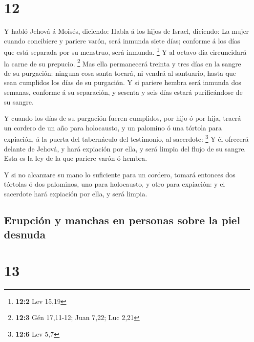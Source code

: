 \hypertarget{section-11}{%
\section{12}\label{section-11}}

 Y habló Jehová á Moisés, diciendo:  Habla á los
hijos de Israel, diciendo: La mujer cuando concibiere y pariere varón,
será inmunda siete días; conforme á los días que está separada por su
menstruo, será inmunda. \footnote{\textbf{12:2} Lev 15,19} 
Y al octavo día circuncidará la carne de su prepucio. \footnote{\textbf{12:3}
  Gén 17,11-12; Juan 7,22; Luc 2,21}  Mas ella permanecerá
treinta y tres días en la sangre de su purgación: ninguna cosa santa
tocará, ni vendrá al santuario, hasta que sean cumplidos los días de su
purgación.  Y si pariere hembra será inmunda dos semanas,
conforme á su separación, y sesenta y seis días estará purificándose de
su sangre.

 Y cuando los días de su purgación fueren cumplidos, por
hijo ó por hija, traerá un cordero de un año para holocausto, y un
palomino ó una tórtola para expiación, á la puerta del tabernáculo del
testimonio, al sacerdote: \footnote{\textbf{12:6} Lev 5,7} 
Y él ofrecerá delante de Jehová, y hará expiación por ella, y será
limpia del flujo de su sangre. Esta es la ley de la que pariere varón ó
hembra.

 Y si no alcanzare su mano lo suficiente para un cordero,
tomará entonces dos tórtolas ó dos palominos, uno para holocausto, y
otro para expiación: y el sacerdote hará expiación por ella, y será
limpia.

\hypertarget{erupciuxf3n-y-manchas-en-personas-sobre-la-piel-desnuda}{%
\subsection{Erupción y manchas en personas sobre la piel
desnuda}\label{erupciuxf3n-y-manchas-en-personas-sobre-la-piel-desnuda}}

\hypertarget{section-12}{%
\section{13}\label{section-12}}

